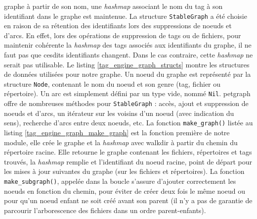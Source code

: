 graphe à partir de son nom, une \textit{hashmap} associant le nom du tag à son identifiant dans le graphe 
est maintenue.
\bigbreak
La structure \texttt{StableGraph} a été choisie en raison de sa rétention des identifiants lors 
des suppressions de noeuds et d'arcs. En effet, lors des opérations de suppression de tags ou de 
fichiers, pour maintenir cohérente la \textit{hashmap} des tags associés aux identifiants du graphe, il 
ne faut pas que cesdits identifiants changent. Dans le cas contraire, cette \textit{hashmap} ne 
serait pas utilisable. Le listing \ref{tag_engine_graph_structs} montre les structures de données 
utilisées pour notre graphe. Un noeud du graphe est représenté par la structure \texttt{Node}, 
contenant le nom du noeud et son genre (tag, fichier ou répertoire). Un arc est simplement défini 
par un type vide, nommé \texttt{Nil}. petgraph offre de nombreuses méthodes pour 
\texttt{StableGraph} : accès, ajout et suppression de noeuds et d'arcs, un itérateur sur 
les voisins d'un noeud (avec indication du sens), recherche d'arcs entre deux noeuds, etc. La 
fonction \texttt{make_graph()} listée au listing \ref{tag_engine_graph_make_graph} est 
la fonction première de notre module, elle crée le graphe et la \textit{hashmap} avec walkdir à partir du
chemin du répertoire racine. Elle retourne le graphe contenant les fichiers, répertoires et tags 
trouvés, la \textit{hashmap} remplie et l'identifiant du noeud racine, point de départ pour les mises à 
jour suivantes du graphe (sur les fichiers et répertoires). La fonction \texttt{make_subgraph()}, 
appelée dans la boucle s'assure d'ajouter correctement les noeuds en fonction du chemin, pour éviter 
de créer deux fois le même noeud ou pour qu'un noeud enfant ne soit créé avant son parent 
(il n'y a pas de garantie de parcourir l'arborescence des fichiers dans un ordre parent-enfants).
\bigbreak
{}
\bigbreak
\bigbreak
{}
